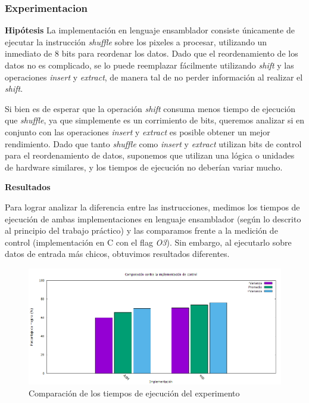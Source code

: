 \documentclass[a4paper]{article}
\begin{document}
\subsubsection{Experimentacion}
\textbf{Hipótesis}
\newline
La implementación en lenguaje ensamblador consiste únicamente de ejecutar la instrucción \textit{shuffle} sobre los pixeles a procesar, utilizando un inmediato de 8 bits para reordenar los datos. Dado que el reordenamiento de los datos no es complicado, se lo puede reemplazar fácilmente utilizando \textit{shift} y las operaciones \textit{insert} y \textit{extract}, de manera tal de no perder información al realizar el \textit{shift}.

Si bien es de esperar que la operación \textit{shift} consuma menos tiempo de ejecución que \textit{shuffle}, ya que simplemente es un corrimiento de bits, queremos analizar si en conjunto con las operaciones \textit{insert} y \textit{extract} es posible obtener un mejor rendimiento. Dado que tanto \textit{shuffle} como \textit{insert} y \textit{extract} utilizan bits de control para el reordenamiento de datos, suponemos que utilizan una lógica o unidades de hardware similares, y los tiempos de ejecución no deberían variar mucho.

\textbf{Resultados}

Para lograr analizar la diferencia entre las instrucciones, medimos los tiempos de ejecución de ambas implementaciones en lenguaje ensamblador (según lo descrito al principio del trabajo práctico) y las comparamos frente a la medición de control (implementación en C con el flag \textit{O3}). Sin embargo, al ejecutarlo sobre datos de entrada más chicos, obtuvimos resultados diferentes.
\\
\begin{figure}[H]
  \begin{center}
	\includegraphics[scale=0.66]{imagenes/smalltilesExpC}
	\caption{Comparación de los tiempos de ejecución del experimento}
	\label{smalltiles_chico}
  \end{center}
\end{figure}
\end{document}
